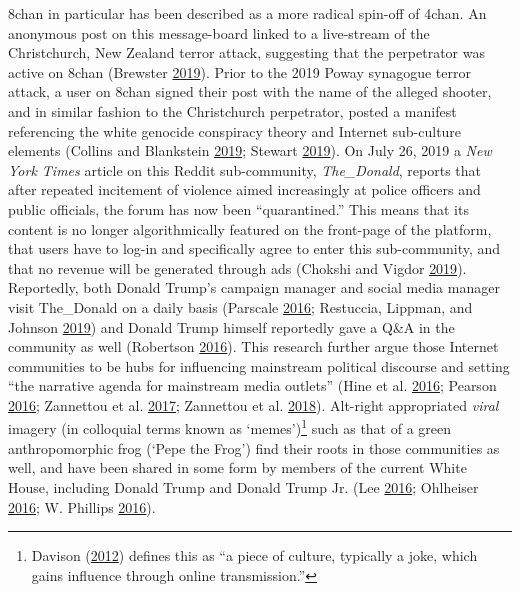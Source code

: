 \documentclass[10pt,british,A4paper,,openany]{memoir}
\begin{document}
8chan in particular has been described as a more radical spin-off of
4chan. An anonymous post on this message-board linked to a live-stream
of the Christchurch, New Zealand terror attack, suggesting that the
perpetrator was active on 8chan (Brewster
\protect\hyperlink{ref-brewster_after_2019}{2019}). Prior to the 2019
Poway synagogue terror attack, a user on 8chan signed their post with
the name of the alleged shooter, and in similar fashion to the
Christchurch perpetrator, posted a manifest referencing the white
genocide conspiracy theory and Internet sub-culture elements (Collins
and Blankstein \protect\hyperlink{ref-collins_anti-semitic_2019}{2019};
Stewart \protect\hyperlink{ref-stewart_8chan_2019}{2019}). On July 26,
2019 a \emph{New York Times} article on this Reddit sub-community,
\emph{The\_Donald}, reports that after repeated incitement of violence
aimed increasingly at police officers and public officials, the forum
has now been ``quarantined.'' This means that its content is no longer
algorithmically featured on the front-page of the platform, that users
have to log-in and specifically agree to enter this sub-community, and
that no revenue will be generated through ads (Chokshi and Vigdor
\protect\hyperlink{ref-chokshi_reddit_2019}{2019}). Reportedly, both
Donald Trump's campaign manager and social media manager visit
The\_Donald on a daily basis (Parscale
\protect\hyperlink{ref-parscale_reddit_2016}{2016}; Restuccia, Lippman,
and Johnson \protect\hyperlink{ref-restuccia_get_2019}{2019}) and Donald
Trump himself reportedly gave a Q\&A in the community as well (Robertson
\protect\hyperlink{ref-robertson_donald_2016}{2016}). This research
further argue those Internet communities to be hubs for influencing
mainstream political discourse and setting ``the narrative agenda for
mainstream media outlets'' (Hine et al.
\protect\hyperlink{ref-hine_kek_2016}{2016}; Pearson
\protect\hyperlink{ref-pearson_scientists_2016}{2016}; Zannettou et al.
\protect\hyperlink{ref-zannettou_web_2017}{2017}; Zannettou et al.
\protect\hyperlink{ref-zannettou_origins_2018}{2018}). Alt-right
appropriated \emph{viral} imagery (in colloquial terms known as
`memes')\footnote{Davison
  (\protect\hyperlink{ref-davison_language_2012}{2012}) defines this as
  ``a piece of culture, typically a joke, which gains influence through
  online transmission.''} such as that of a green anthropomorphic frog
(`Pepe the Frog') find their roots in those communities as well, and
have been shared in some form by members of the current White House,
including Donald Trump and Donald Trump Jr. (Lee
\protect\hyperlink{ref-lee_understanding_2016}{2016}; Ohlheiser
\protect\hyperlink{ref-ohlheiser_analysis_2016}{2016}; W. Phillips
\protect\hyperlink{ref-phillips_alt-right_2016}{2016}).
\end{document}
